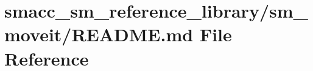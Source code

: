 \hypertarget{smacc__sm__reference__library_2sm__moveit_2README_8md}{}\section{smacc\+\_\+sm\+\_\+reference\+\_\+library/sm\+\_\+moveit/\+R\+E\+A\+D\+ME.md File Reference}
\label{smacc__sm__reference__library_2sm__moveit_2README_8md}
